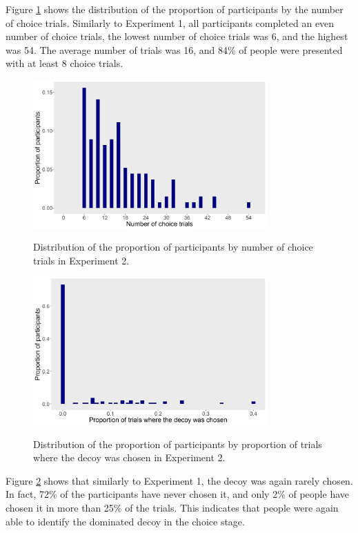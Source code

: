 \documentclass[11pt,a4paper]{article}
\begin{document}
 Figure \ref{fig:exp2_hist} shows the distribution of the proportion of participants by the number of choice trials. Similarly to Experiment 1, all participants completed an even number of choice trials, the lowest number of choice trials was 6, and the highest was 54. The average number of trials was 16, and 84\% of people were presented with at least 8 choice trials. 
\begin{figure}[htb!]
\centering
\captionsetup{justification=centering}
\caption{Distribution of the proportion of participants by number of choice trials in
Experiment 2.}
\includegraphics[width=0.8\textwidth]{exp2_hist.png}
\label{fig:exp2_hist}
\end{figure}
 
\begin{figure}[htb!]
\centering
\captionsetup{justification=centering}
\caption{Distribution of the proportion of participants by proportion of trials where the
decoy was chosen in Experiment 2.}
\includegraphics[width=0.8\textwidth]{exp2_decoytrials.png}
\label{fig:exp2_decoytrials}
\end{figure}

Figure \ref{fig:exp2_decoytrials} shows that similarly to Experiment 1, the decoy was again rarely chosen. In fact, 72\% of the participants have never chosen it, and only 2\% of people have chosen it in more than 25\% of the trials. This indicates that people were again able to identify the dominated decoy in the choice stage. 
\end{document}
